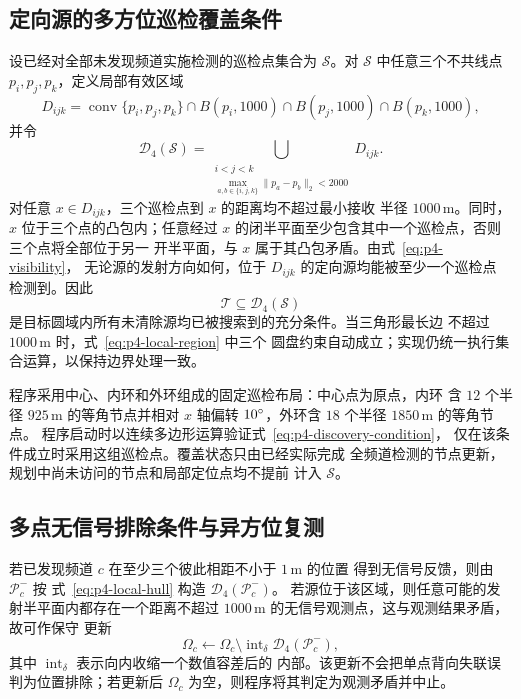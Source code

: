 \subsection{定向源的多方位巡检覆盖条件}

设已经对全部未发现频道实施检测的巡检点集合为 $\mathcal S$。对
$\mathcal S$ 中任意三个不共线点 $p_i,p_j,p_k$，定义局部有效区域
\begin{equation}
  D_{ijk}=
  \operatorname{conv}\{p_i,p_j,p_k\}
  \cap B(p_i,1000)\cap B(p_j,1000)\cap B(p_k,1000),
  \label{eq:p4-local-region}
\end{equation}
并令
\begin{equation}
  \mathcal D_4(\mathcal S)
  =\bigcup_{\substack{i<j<k\\
  \max_{a,b\in\{i,j,k\}}\|p_a-p_b\|_2<2000}}
  D_{ijk}.
  \label{eq:p4-local-hull}
\end{equation}
对任意 $x\in D_{ijk}$，三个巡检点到 $x$ 的距离均不超过最小接收
半径 $1000\,\mathrm m$。同时，$x$ 位于三个点的凸包内；任意经过
$x$ 的闭半平面至少包含其中一个巡检点，否则三个点将全部位于另一
开半平面，与 $x$ 属于其凸包矛盾。由式~\eqref{eq:p4-visibility}，
无论源的发射方向如何，位于 $D_{ijk}$ 的定向源均能被至少一个巡检点
检测到。因此
\begin{equation}
  \mathcal T\subseteq\mathcal D_4(\mathcal S)
  \label{eq:p4-discovery-condition}
\end{equation}
是目标圆域内所有未清除源均已被搜索到的充分条件。当三角形最长边
不超过 $1000\,\mathrm m$ 时，式~\eqref{eq:p4-local-region} 中三个
圆盘约束自动成立；实现仍统一执行集合运算，以保持边界处理一致。

程序采用中心、内环和外环组成的固定巡检布局：中心点为原点，内环
含 $12$ 个半径 $925\,\mathrm m$ 的等角节点并相对 $x$ 轴偏转
$10^{\circ}$，外环含 $18$ 个半径 $1850\,\mathrm m$ 的等角节点。
程序启动时以连续多边形运算验证式~\eqref{eq:p4-discovery-condition}，
仅在该条件成立时采用这组巡检点。覆盖状态只由已经实际完成
全频道检测的节点更新，规划中尚未访问的节点和局部定位点均不提前
计入 $\mathcal S$。

\subsection{多点无信号排除条件与异方位复测}

若已发现频道 $c$ 在至少三个彼此相距不小于 $1\,\mathrm m$ 的位置
得到无信号反馈，则由 $\mathcal P_c^-$ 按
式~\eqref{eq:p4-local-hull} 构造 $\mathcal D_4(\mathcal P_c^-)$。
若源位于该区域，则任意可能的发射半平面内都存在一个距离不超过
$1000\,\mathrm m$ 的无信号观测点，这与观测结果矛盾，故可作保守
更新
\begin{equation}
  \Omega_c\leftarrow
  \Omega_c\setminus
  \operatorname{int}_{\delta}
  \mathcal D_4(\mathcal P_c^-),
  \label{eq:p4-negative-update}
\end{equation}
其中 $\operatorname{int}_{\delta}$ 表示向内收缩一个数值容差后的
内部。该更新不会把单点背向失联误判为位置排除；若更新后
$\Omega_c$ 为空，则程序将其判定为观测矛盾并中止。

